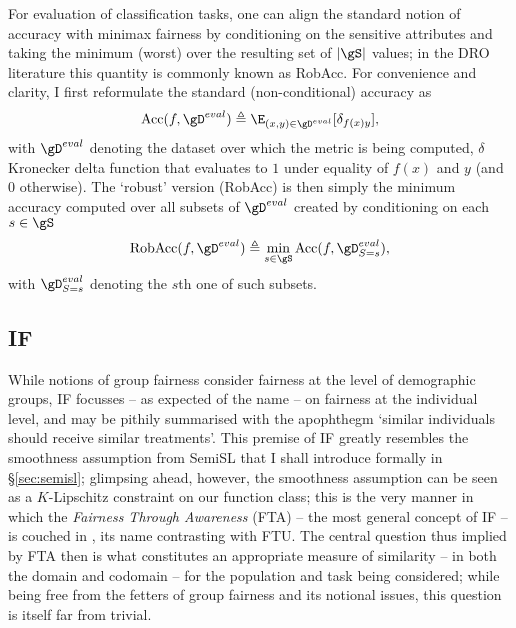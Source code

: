 %
For evaluation of classification tasks, one can align the standard notion of accuracy with minimax
fairness by conditioning on the sensitive attributes and taking the minimum (worst) over the
resulting set of \(|\gS|\) values; in the \ac{DRO} literature this quantity is commonly known as
\ac{RobAcc}.
%
For convenience and clarity, I first reformulate the standard (non-conditional) accuracy as 
%
\begin{equation}
    \text{Acc}(f, \gD^{eval}) \triangleq 
    \E_{ (x, y) \in \gD^{eval}}[ \delta_{f(x)y} ],
 \end{equation}
%
with \( \gD^{eval} \) denoting the dataset over which the metric is being computed, \( \delta
\) Kronecker delta function that evaluates to \(1\) under equality of \(f(x)\) and \(y\) (and \(0\)
otherwise).
%
The `robust' version (\acs{RobAcc}) is then simply the minimum accuracy computed over all subsets of \(
\gD^{eval} \) created by conditioning on each \(s \in \gS \)
%
\begin{equation}
    \text{RobAcc}(f, \gD^{eval}) \triangleq 
    \underset{s \in \gS}{\text{min}} \, \text{Acc}(f, \gD^{eval}_{S=s}),
 \end{equation}
%
 with \( \gD^{eval}_{S=s} \) denoting the \(s\)th one of such subsets.
%
 \subsection{\Acl{IF}}\label{ssec:individual-fairness}
While notions of group fairness consider fairness at the level of demographic groups, \ac{IF}
focusses -- as expected of the name -- on fairness at the individual level, and may be pithily
summarised with the apophthegm `similar individuals should receive similar treatments'.
%
This premise of \ac{IF} greatly resembles the smoothness assumption from \ac{SemiSL} that I shall
introduce formally in \S\ref{sec:semisl}; glimpsing ahead, however, the smoothness assumption can
be seen as a \(K\)-Lipschitz constraint on our function class; this is the very manner in which the
\emph{Fairness Through Awareness} (FTA) -- the most general concept of \ac{IF} -- is couched in
\citet{dwork2012fairness}, its name contrasting with FTU.
%
The central question thus implied by FTA then is what constitutes an appropriate measure of
similarity -- in both the domain and codomain -- for the population and task being considered;
while being free from the fetters of group fairness and its notional issues, this question is
itself far from trivial.
%
